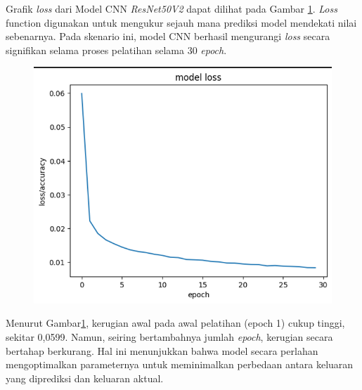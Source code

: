 Grafik \textit{loss} dari Model CNN \textit{ResNet50V2 }dapat dilihat pada Gambar \ref{fig:lossModelCNNResNet50v2}. \textit{Loss} function digunakan untuk mengukur sejauh mana prediksi model mendekati nilai sebenarnya. Pada skenario ini, model CNN berhasil mengurangi \textit{loss} secara signifikan selama proses pelatihan selama 30\textit{ epoch}.

\begin{figure}[!hbt]
	\centering
	\includegraphics[width=0.7\linewidth]{gambar/bener/Loss_ModelCNNResNet50V2.png}
	\label{fig:lossModelCNNResNet50v2}
\end{figure}

Menurut Gambar\ref{fig:lossModelCNNResNet50v2}, kerugian awal pada awal pelatihan (epoch 1) cukup tinggi, sekitar 0,0599. Namun, seiring bertambahnya jumlah\textit{ epoch}, kerugian secara bertahap berkurang. Hal ini menunjukkan bahwa model secara perlahan mengoptimalkan parameternya untuk meminimalkan perbedaan antara keluaran yang diprediksi dan keluaran aktual.

